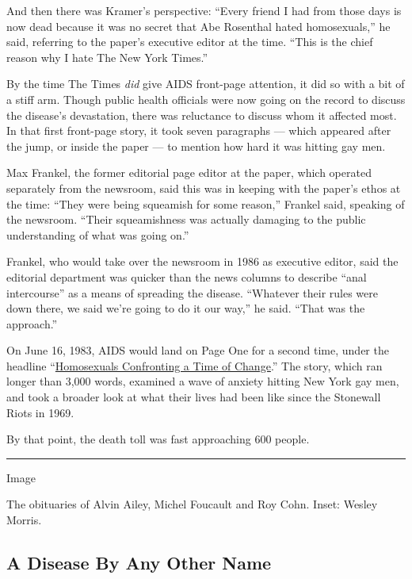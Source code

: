 And then there was Kramer's perspective: ``Every friend I had from those
days is now dead because it was no secret that Abe Rosenthal hated
homosexuals,'' he said, referring to the paper's executive editor at the
time. ``This is the chief reason why I hate The New York Times.''

By the time The Times \emph{did} give AIDS front-page attention, it did
so with a bit of a stiff arm. Though public health officials were now
going on the record to discuss the disease's devastation, there was
reluctance to discuss whom it affected most. In that first front-page
story, it took seven paragraphs --- which appeared after the jump, or
inside the paper --- to mention how hard it was hitting gay men.

Max Frankel, the former editorial page editor at the paper, which
operated separately from the newsroom, said this was in keeping with the
paper's ethos at the time: ``They were being squeamish for some
reason,'' Frankel said, speaking of the newsroom. ``Their squeamishness
was actually damaging to the public understanding of what was going
on.''

Frankel, who would take over the newsroom in 1986 as executive editor,
said the editorial department was quicker than the news columns to
describe ``anal intercourse'' as a means of spreading the disease.
``Whatever their rules were down there, we said we're going to do it our
way,'' he said. ``That was the approach.''

On June 16, 1983, AIDS would land on Page One for a second time, under
the headline
``\href{https://www.nytimes3xbfgragh.onion/1983/06/16/nyregion/homosexuals-confronting-a-time-of-change.html}{Homosexuals
Confronting a Time of Change}.'' The story, which ran longer than 3,000
words, examined a wave of anxiety hitting New York gay men, and took a
broader look at what their lives had been like since the Stonewall Riots
in 1969.

By that point, the death toll was fast approaching 600 people.

\begin{center}\rule{0.5\linewidth}{\linethickness}\end{center}

Image

The obituaries of Alvin Ailey, Michel Foucault and Roy Cohn. Inset:
Wesley Morris.

\hypertarget{a-disease-by-any-other-name}{%
\subsection{A Disease By Any Other
Name}\label{a-disease-by-any-other-name}}

